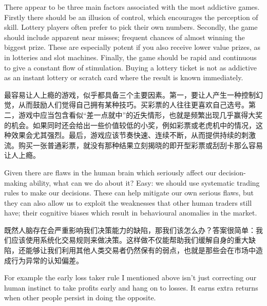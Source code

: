 \bipairgap

\begin{englishblock} There appear to be three main factors associated with the most addictive games. Firstly there should be an illusion of control, which encourages the perception of skill. Lottery players often prefer to pick their own numbers. Secondly, the game should include apparent near misses; frequent chances of almost winning the biggest prize. These are especially potent if you also receive lower value prizes, as in lotteries and slot machines. Finally, the game should be rapid and continuous to give a constant flow of stimulation. Buying a lottery ticket is not as addictive as an instant lottery or scratch card where the result is known immediately. \end{englishblock}

\begin{chineseblock}最容易让人上瘾的游戏，似乎都具备三个主要因素。第一，要让人产生一种控制幻觉，从而鼓励人们觉得自己拥有某种技巧。买彩票的人往往更喜欢自己选号。第二，游戏中应当包含看似“差一点就中”的近失情形，也就是频繁出现几乎赢得大奖的机会。如果同时还会给出一些价值较低的小奖，例如彩票或老虎机中的情况，这种效果会尤其强烈。最后，游戏应该节奏快速、连续不断，从而提供持续的刺激流。购买一张普通彩票，就没有那种结果立刻揭晓的即开型彩票或刮刮卡那么容易让人上瘾。\end{chineseblock}


\begin{englishblock} Given there are flaws in the human brain which seriously affect our decision-making ability, what can we do about it? Easy: we should use systematic trading rules to make our decisions. These can help mitigate our own serious flaws, but they can also allow us to exploit the weaknesses that other human traders still have; their cognitive biases which result in behavioural anomalies in the market. \end{englishblock}

\begin{chineseblock}既然人脑存在会严重影响我们决策能力的缺陷，那我们该怎么办？答案很简单：我们应该使用系统化交易规则来做决策。这样做不仅能帮助我们缓解自身的重大缺陷，还能够让我们利用其他人类交易者仍然保有的弱点，也就是那些会在市场中造成行为异常的认知偏差。\end{chineseblock}

\bipairgap

\begin{englishblock} For example the early loss taker rule I mentioned above isn't just correcting our human instinct to take profits early and hang on to losses. It earns extra returns when other people persist in doing the opposite. \end{englishblock}

